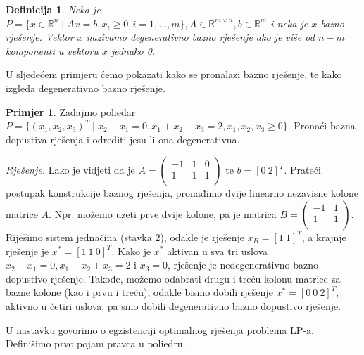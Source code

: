 \documentclass[a4paper, utf8, 11pt, colorlinks]{book}
\newtheorem{definition}{Definicija}[chapter]
\theoremstyle{definition}
\newtheorem{primjer}{Primjer}[chapter]
\begin{document}
\begin{definition}
      Neka je $P = \{ x \in \mathbb{R}^n \mid A x = b,  x_i \geq 0, i=1,\ldots,m \}, A \in \mathbb{R}^{m \times n}, b \in \mathbb{R}^m$    i neka je $x$ bazno rješenje. Vektor $x$ nazivamo degenerativno bazno rješenje ako je više od $n-m$ komponenti u vektoru $x$   jednako 0.
\end{definition}
U sljedećem primjeru ćemo pokazati kako se pronalazi bazno rješenje, te kako izgleda degenerativno bazno rješenje.

\begin{primjer} Zadajmo poliedar $P= \{ (x_1,x_2,x_3)^T \mid x_2 - x_1 = 0, x_1 + x_2 +   x_3 = 2, x_1,x_2,x_3 \geq 0 \}$.  Pronaći bazna dopustiva rješenja i odrediti jesu li ona degenerativna. 
\end{primjer}

\emph{Rješenje.} Lako je vidjeti da je  
$A=\left (\begin{array}{ccc}
   -1  &  1 & 0  \\
   1  &  1 & 1 \\
\end{array} \right )$ te $b = [0\ 2]^T$. Prateći postupak konstrukcije baznog rješenja, pronađimo dvije linearno nezavisne kolone matrice $A$. Npr. možemo uzeti prve dvije kolone, pa je matrica $B=\left (\begin{array}{cc}
   -1  & 1    \\
   1  &  1   \\
\end{array} \right ) .$ Riješimo sistem jednačina (stavka 2), odakle je rješenje $x_B = [1\ 1]^T$, a krajnje rješenje je $x^* = [1\ 1\ 0]^T$. Kako je 
$x^*$ aktivan u sva tri uslova $x_2 - x_1 = 0, x_1 + x_2 +  x_3 = 2$ i $x_3 = 0$, rješenje je nedegenerativno bazno dopustivo rješenje.  Takođe, možemo odabrati drugu i treću kolonu matrice za bazne kolone (kao i prvu i treću), odakle bismo dobili rješenje $x^* = [0\ 0\ 2]^T$, aktivno u četiri uslova, pa smo dobili degenerativno bazno dopustivo rješenje. 


U nastavku govorimo o egzistenciji optimalnog rješenja problema LP-a. Definišimo prvo pojam pravca u poliedru.
\end{document}
